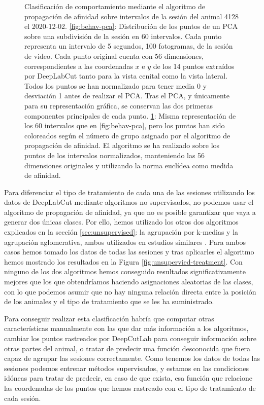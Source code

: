 \begin{figure}[h]
\begin{subfigure}{0.45\textwidth}
    \caption{}
    \label{fig:behav-aff}
  \end{subfigure}
  \caption[Clasificación no supervisada de comportamiento.]{Clasificación de comportamiento mediante el algoritmo de propagación de afinidad sobre intervalos de la sesión del animal 4128 el 2020-12-02. \ref{fig:behav-pca}: Distribución de los puntos de un PCA sobre una subdivisión de la sesión en 60 intervalos. Cada punto representa un intervalo de 5 segundos, 100 fotogramas, de la sesión de video. Cada punto original cuenta con 56 dimensiones, correspondientes a las coordenadas $ x $ e $ y $ de los 14 puntos extraídos por DeepLabCut tanto para la vista cenital como la vista lateral. Todos los puntos se han normalizado para tener media 0 y desviación 1 antes de realizar el PCA. Tras el PCA, y únicamente para su representación gráfica, se conservan las dos primeras componentes principales de cada punto. \ref{fig:behav-aff}: Misma representación de los 60 intervalos que en \ref{fig:behav-pca}, pero los puntos han sido coloreados según el número de grupo asignado por el algoritmo de propagación de afinidad. El algoritmo se ha realizado sobre los puntos de los intervalos normalizados, manteniendo las 56 dimensiones originales y utilizando la norma euclídea como medida de afinidad.}
  \label{fig:unsupervied-behav}
\end{figure}

Para diferenciar el tipo de tratamiento de cada una de las sesiones utilizando los datos de DeepLabCut mediante algoritmos no supervisados, no podemos usar el algoritmo de propagación de afinidad, ya que no es posible garantizar que vaya a generar dos únicas clases. Por ello, hemos utilizado los otros dos algoritmos explicados en la sección \ref{sec:unsupervised}: la agrupación por k-medias y la agrupación aglomerativa, ambos utilizados en estudios similares \cite{frontiers}. Para ambos casos hemos tomado los datos de todas las sesiones y tras aplicarles el algoritmo hemos mostrado los resultados en la Figura \ref{fig:unsupervied-treatment}. Con ninguno de los dos algoritmos hemos conseguido resultados significativamente mejores que los que obtendríamos haciendo asignaciones aleatorias de las clases, con lo que podemos asumir que no hay ninguna relación directa entre la posición de los animales y el tipo de tratamiento que se les ha suministrado.

Para conseguir realizar esta clasificación habría que computar otras características manualmente con las que dar más información a los algoritmos, cambiar los puntos rastreados por DeepCutLab para conseguir información sobre otras partes del animal, o tratar de predecir una función desconocida que fuera capaz de agrupar las sesiones correctamente. Como tenemos los datos de todas las sesiones podemos entrenar métodos supervisados, y estamos en las condiciones idóneas para tratar de predecir, en caso de que exista, esa función que relacione las coordenadas de los puntos que hemos rastreado con el tipo de tratamiento de cada sesión.

